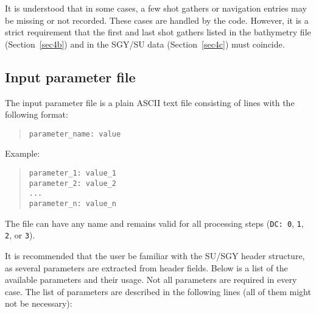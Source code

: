 \documentclass[11pt, oneside]{article}   	%
\begin{document}
It is understood that in some cases, a few shot gathers or navigation entries may be missing or not recorded. These cases are handled by the code. However, it is a strict requirement that the first and last shot gathers listed in the bathymetry file (Section~\ref{sec4b}) and in the SGY/SU data (Section~\ref{sec4c}) must coincide.

\subsection{Input parameter file}\label{sec4a}

The input parameter file is a plain ASCII text file consisting of lines with the following format:

\begin{quote}
\texttt{parameter\_name: value}
\end{quote}

Example:

\begin{quote}
\texttt{parameter\_1: value\_1} \\
\texttt{parameter\_2: value\_2} \\
\texttt{...} \\
\texttt{parameter\_n: value\_n}
\end{quote}

The file can have any name and remains valid for all processing steps (\texttt{DC: 0}, \texttt{1}, \texttt{2}, or \texttt{3}).

It is recommended that the user be familiar with the SU/SGY header structure, as several parameters are extracted from header fields. Below is a list of the available parameters and their usage. Not all parameters are required in every case. The list of parameters are described in the following lines (all of them might not be necessary):
\end{document}
